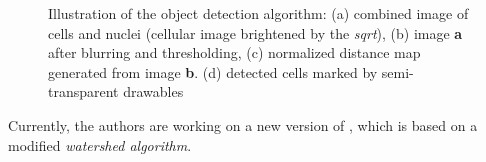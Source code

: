 \begin{figure}
\vspace*{.1in}
\begin{center}
\end{center}
\caption{\label{figure:analysis}
    Illustration of the object detection algorithm: (a) combined image of cells and nuclei (cellular image brightened by the {\em sqrt}), (b) image {\bf a} after blurring and thresholding, (c) normalized distance map generated from image {\bf b}. (d) detected cells marked by semi-transparent drawables
}
\end{figure}

Currently, the authors are working on a new version of , which is based on a modified {\em watershed algorithm}.

\begin{figure}
\vspace*{.1in}
\end{figure}

